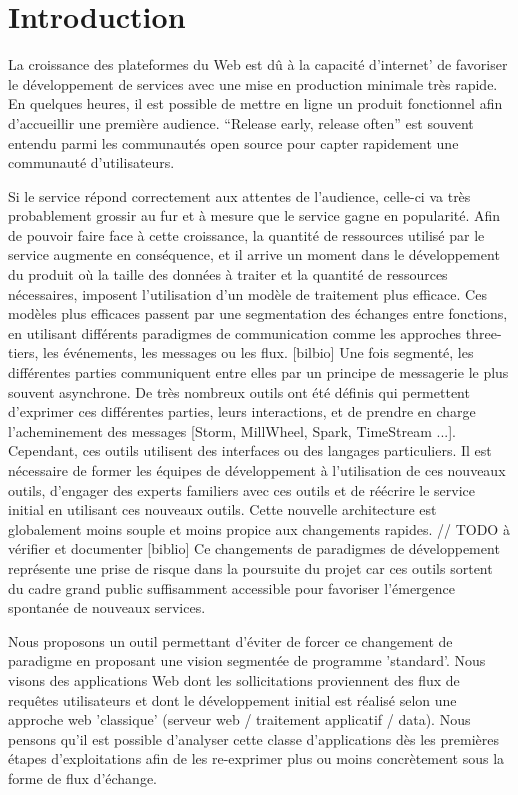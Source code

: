 \section{Introduction}

La croissance des plateformes du Web est dû à la capacité d'internet' de favoriser le développement de services avec une mise en production minimale très rapide.
En quelques heures, il est possible de mettre en ligne un produit fonctionnel afin d'accueillir une première audience.
``Release early, release often'' est souvent entendu parmi les communautés open source pour capter rapidement une communauté d'utilisateurs.

Si le service répond correctement aux attentes de l'audience, celle-ci va très probablement grossir au fur et à mesure que le service gagne en popularité.
Afin de pouvoir faire face à cette croissance, la quantité de ressources utilisé par le service augmente en conséquence, et il arrive un moment dans le développement du produit où la taille des données à traiter et la quantité de ressources nécessaires, imposent l'utilisation d'un modèle de traitement plus efficace.
Ces modèles plus efficaces passent par une segmentation des échanges entre fonctions, en utilisant différents paradigmes de communication comme les approches three-tiers, les événements, les messages ou les flux. [bilbio]
Une fois segmenté, les différentes parties communiquent entre elles par un principe de messagerie le plus souvent asynchrone.
De très nombreux outils ont été définis qui permettent d'exprimer ces différentes parties, leurs interactions, et de prendre en charge l'acheminement des messages [Storm, MillWheel, Spark, TimeStream ...].
Cependant, ces outils utilisent des interfaces ou des langages particuliers. Il est nécessaire de former les équipes de développement à l'utilisation de ces nouveaux outils, d'engager des experts familiers avec ces outils et de réécrire le service initial en utilisant ces nouveaux outils.
Cette nouvelle architecture est globalement moins souple et moins propice aux changements rapides. // TODO à vérifier et documenter [biblio]
Ce changements de paradigmes de développement représente une prise de risque dans la poursuite du projet car ces outils sortent du cadre grand public suffisamment accessible pour favoriser l'émergence spontanée de nouveaux services.

Nous proposons un outil permettant d'éviter de forcer ce changement de paradigme en proposant une vision segmentée de programme 'standard'.
Nous visons des applications Web dont les sollicitations proviennent des flux de requêtes utilisateurs et dont le développement initial est réalisé selon une approche web 'classique' (serveur web / traitement applicatif / data).
Nous pensons qu'il est possible d'analyser cette classe d'applications dès les premières étapes d'exploitations afin de les re-exprimer plus ou moins concrètement sous la forme de flux d'échange.

